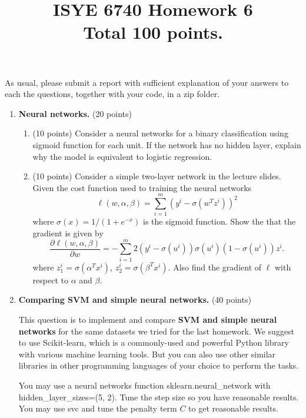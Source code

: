 \documentclass[twoside,10pt]{article}
\begin{document}
\title{ISYE 6740 Homework 6\\ 
\small Total 100 points.}
\date{}
\maketitle



As usual, please submit a report with sufficient explanation of your answers to each the questions, together with your code, in a zip folder.


\begin{enumerate}

\item {\bf Neural networks.} (20 points)

\begin{enumerate}
\item (10 points) 
Consider a neural networks for a binary classification using sigmoid function for each unit. If the network has no hidden layer, explain why the model is equivalent to logistic regression. 
\item (10 points) Consider a simple two-layer network in the lecture slides. Given the cost function used to training the neural networks
\[
\ell(w, \alpha, \beta) = \sum_{i=1}^m (y^i - \sigma(w^T z^i))^2
\]
where $\sigma (x) = 1/(1+e^{-x})$ is the sigmoid function. Show the that the gradient is given by
\[
\frac{\partial \ell(w, \alpha, \beta) }{\partial w}
= - \sum_{i=1}^m 2(y^i - \sigma(u^i))\sigma(u^i)(1-\sigma(u^i)) z^i.
\]
where $z_1^i = \sigma(\alpha^T x^i)$, $z_2^i = \sigma(\beta^T x^i)$. Also find the gradient of $\ell$ with respect to $\alpha$ and $\beta$.  
\end{enumerate}

\clearpage

\item {\bf Comparing SVM and simple neural networks.} (40 points)

This question is to implement and compare {\bf SVM and simple neural networks} for the same datasets we tried for the last homework. We suggest to use \textsf{Scikit-learn}, which is a commonly-used and powerful \textsf{Python} library with various machine learning tools. But you can also use other similar libraries in other programming languages of your choice to perform the tasks. 

You may use a neural networks function \textsf{sklearn.neural\_network} with \textsf{hidden\_layer\_sizes=(5, 2)}. Tune the step size so you have reasonable results. You may use \textsf{svc} and tune the penalty term $C$ to get reasonable results. 


\end{enumerate}
\end{document}

